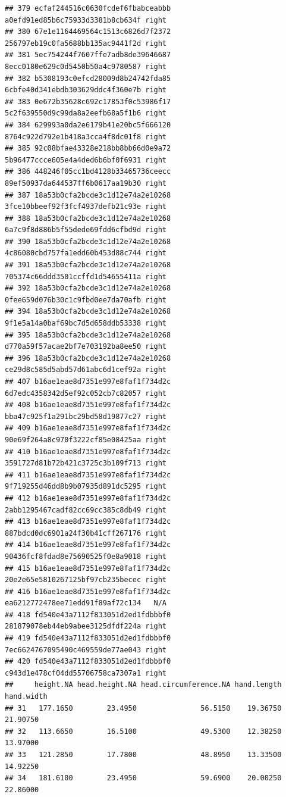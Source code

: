 \documentclass[]{article}
\begin{document}
\begin{verbatim}
## 379 ecfaf244516c0630fcdef6fbabceabbb a0efd91ed85b6c75933d3381b8cb634f right
## 380 67e1e1164469564c1513c6826d7f2372 256797eb19c0fa5688bb135ac9441f2d right
## 381 5ec754244f7607ffe7adb8de39646687 8ecc0180e629c0d5450b50a4c9780587 right
## 382 b5308193c0efcd28009d8b24742fda85 6cbfe40d341ebdb303629ddc4f360e7b right
## 383 0e672b35628c692c17853f0c53986f17 5c2f639550d9c99da8a2eefb68a5f1b6 right
## 384 629993a0da2e6179b41e20bc5f666120 8764c922d792e1b418a3cca4f8dc01f8 right
## 385 92c08bfae43328e218bb8bb66d0e9a72 5b96477ccce605e4a4ded6b6bf0f6931 right
## 386 448246f05cc1bd4128b33465736ceecc 89ef50937da644537ff6b0617aa19b30 right
## 387 18a53b0cfa2bcde3c1d12e74a2e10268 3fce10bbeef92f3fcf4937defb21c93e right
## 388 18a53b0cfa2bcde3c1d12e74a2e10268 6a7c9f8d886b5f55dede69fdd6cfbd9d right
## 390 18a53b0cfa2bcde3c1d12e74a2e10268 4c86080cbd757fa1edd60b453d88c744 right
## 391 18a53b0cfa2bcde3c1d12e74a2e10268 705374c66ddd3501ccffd1d54655411a right
## 392 18a53b0cfa2bcde3c1d12e74a2e10268 0fee659d076b30c1c9fbd0ee7da70afb right
## 394 18a53b0cfa2bcde3c1d12e74a2e10268 9f1e5a14a0baf69bc7d5d658ddb53338 right
## 395 18a53b0cfa2bcde3c1d12e74a2e10268 d770a59f57acae2bf7e703192ba8ee50 right
## 396 18a53b0cfa2bcde3c1d12e74a2e10268 ce29d8c585d5abd57d61abc6d1cef92a right
## 407 b16ae1eae8d7351e997e8faf1f734d2c 6d7edc4358342d5ef92c052cb7c82057 right
## 408 b16ae1eae8d7351e997e8faf1f734d2c bba47c925f1a291bc29bd58d19877c27 right
## 409 b16ae1eae8d7351e997e8faf1f734d2c 90e69f264a8c970f3222cf85e08425aa right
## 410 b16ae1eae8d7351e997e8faf1f734d2c 3591727d81b72b421c3725c3b109f713 right
## 411 b16ae1eae8d7351e997e8faf1f734d2c 9f719255d46dd8b9b07935d891dc5295 right
## 412 b16ae1eae8d7351e997e8faf1f734d2c 2abb1295467cadf82cc69cc385c8db49 right
## 413 b16ae1eae8d7351e997e8faf1f734d2c 887bdcd0dc6901a24f30b41cff267176 right
## 414 b16ae1eae8d7351e997e8faf1f734d2c 90436fcf8fdad8e75690525f0e8a9018 right
## 415 b16ae1eae8d7351e997e8faf1f734d2c 20e2e65e5810267125bf97cb235becec right
## 416 b16ae1eae8d7351e997e8faf1f734d2c ea6212772478ee71edd91f89af72c134   N/A
## 418 fd540e43a7112f833051d2ed1fdbbbf0 281879078eb44eb9abee3125dfdf224a right
## 419 fd540e43a7112f833051d2ed1fdbbbf0 7ec6624767095490c469559de77ae043 right
## 420 fd540e43a7112f833051d2ed1fdbbbf0 c943d1e478cf04dd55706758ca7307a1 right
##     height.NA head.height.NA head.circumference.NA hand.length hand.width
## 31   177.1650        23.4950               56.5150    19.36750   21.90750
## 32   113.6650        16.5100               49.5300    12.38250   13.97000
## 33   121.2850        17.7800               48.8950    13.33500   14.92250
## 34   181.6100        23.4950               59.6900    20.00250   22.86000

\end{verbatim}
\end{document}

